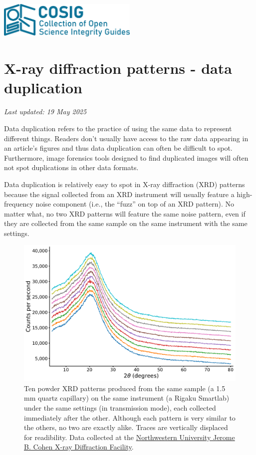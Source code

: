 \documentclass[letterpaper, 12pt]{article}
\begin{document}
\flushleft
\includegraphics[width=0.5\textwidth]{img/home/241017_final_logo_mockup.png}

\section*{X-ray diffraction patterns - data duplication}
\textit{Last updated: 19 May 2025}

Data duplication refers to the practice of using the same data to represent different things. Readers don't usually have access to the raw data appearing in an article's figures and thus data duplication can often be difficult to spot. Furthermore, image forensics tools designed to find duplicated images will often not spot duplications in other data formats.

Data duplication is relatively easy to spot in X-ray diffraction (XRD) patterns because the signal collected from an XRD instrument will usually feature a high-frequency noise component (i.e., the ``fuzz'' on top of an XRD pattern). No matter what, no two XRD patterns will feature the same noise pattern, even if they are collected from the same sample on the same instrument with the same settings.

\begin{figure}[h!tbp]
    \centering
    \includegraphics[width=\textwidth]{img/xrd_data_duplication/250519_xrd_x10.pdf}
    \caption*{Ten powder XRD patterns produced from the same sample (a 1.5 mm quartz capillary) on the same instrument (a Rigaku Smartlab) under the same settings (in transmission mode), each collected immediately after the other. Although each pattern is very similar to the others, no two are exactly alike. Traces are vertically displaced for readibility. Data collected at the \href{https://www.xray.facilities.northwestern.edu/}{Northwestern University Jerome B. Cohen X-ray Diffraction Facility}.}
\end{figure}
\end{document}
